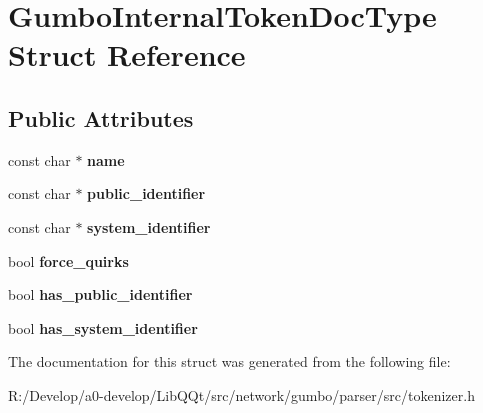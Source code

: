 \hypertarget{struct_gumbo_internal_token_doc_type}{}\section{Gumbo\+Internal\+Token\+Doc\+Type Struct Reference}
\label{struct_gumbo_internal_token_doc_type}
\subsection*{Public Attributes}
\begin{DoxyCompactItemize}
\item 
\mbox{\label{struct_gumbo_internal_token_doc_type_a040f4bfeee17e87068570c48c9033fa1}} 
const char $\ast$ {\bfseries name}
\item 
\mbox{\label{struct_gumbo_internal_token_doc_type_ae58beb2bda656355e1aa10e60b889634}} 
const char $\ast$ {\bfseries public\+\_\+identifier}
\item 
\mbox{\label{struct_gumbo_internal_token_doc_type_aa432c26309ce20b68de3595bce6188f8}} 
const char $\ast$ {\bfseries system\+\_\+identifier}
\item 
\mbox{\label{struct_gumbo_internal_token_doc_type_a19c27676815c3bc5c9a018d518ed1828}} 
bool {\bfseries force\+\_\+quirks}
\item 
\mbox{\label{struct_gumbo_internal_token_doc_type_acb1ad995443a1b64a507d422a66fdb52}} 
bool {\bfseries has\+\_\+public\+\_\+identifier}
\item 
\mbox{\label{struct_gumbo_internal_token_doc_type_afd58436292186531f388780487a9cc0b}} 
bool {\bfseries has\+\_\+system\+\_\+identifier}
\end{DoxyCompactItemize}


The documentation for this struct was generated from the following file\+:\begin{DoxyCompactItemize}
\item 
R\+:/\+Develop/a0-\/develop/\+Lib\+Q\+Qt/src/network/gumbo/parser/src/tokenizer.\+h\end{DoxyCompactItemize}
